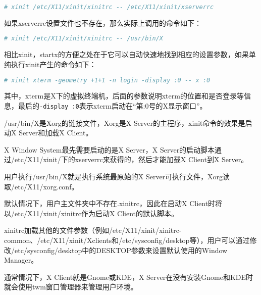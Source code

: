 \begin{lstlisting}[language=bash]
# xinit /etc/X11/xinit/xinitrc -- /etc/X11/xinit/xserverrc
\end{lstlisting}

如果xserverrc设置文件也不存在，那么实际上调用的命令如下：

\begin{lstlisting}[language=bash]
# xinit /etc/X11/xinit/xinitrc -- /usr/bin/X
\end{lstlisting}

相比xinit，startx的方便之处在于它可以自动快速地找到相应的设置参数，如果单纯执行xinit产生的命令如下：

\begin{lstlisting}[language=bash]
# xinit xterm -geometry +1+1 -n login -display :0 -- x :0
\end{lstlisting}
其中，xterm是X下的虚拟终端机，后面的参数说明xterm的位置和是否登录等信息，最后的\texttt{-display~:0}表示xterm启动在“第:0号的X显示窗口”。

/usr/bin/X是Xorg的链接文件，Xorg是X Server的主程序，xinit命令的效果是启动X Server和加载X Client。


X Window System最先需要启动的是X Server，X Server的启动脚本通过/etc/X11/xinit/下的xserverrc来获得的，然后才能加载X Client到X Server。

用户执行/usr/bin/X就是执行系统最原始的X Server可执行文件，Xorg读取/etc/X11/xorg.conf。

默认情况下，用户主文件夹中不存在.xinitrc，因此在启动X Client时将以/etc/X11/xinit/xinitrc作为启动X Client的默认脚本。

xinitrc加载其他的文件参数（例如/etc/X11/xinit/xinitrc-common、/etc/X11/xinit/Xclients和/etc/sysconfig/desktop等），用户可以通过修改/etc/sysconfig/desktop中的DESKTOP参数来设置默认使用的Window Manager。

通常情况下，X Client就是Gnome或KDE，X Server在没有安装Gnome和KDE时就会使用twm窗口管理器来管理用户环境。







































































